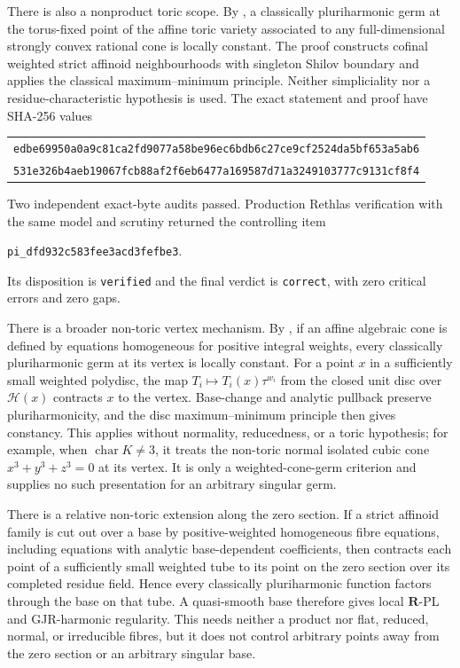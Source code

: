 There is also a nonproduct toric scope.  By
, a classically pluriharmonic germ
at the torus-fixed point of the affine toric variety associated to any
full-dimensional strongly convex rational cone is locally constant.  The
proof constructs cofinal weighted strict affinoid neighbourhoods with
singleton Shilov boundary and applies the classical maximum--minimum
principle.  Neither simpliciality nor a residue-characteristic hypothesis is
used.  The exact statement and proof have SHA-256 values
\begin{center}
\small
\begin{tabular}{@{}c@{}}
\nolinkurl{edbe69950a0a9c81ca2fd9077a58be96ec6bdb6c27ce9cf2524da5bf653a5ab6}\\
\nolinkurl{531e326b4aeb19067fcb88af2f6eb6477a169587d71a3249103777c9131cf8f4}
\end{tabular}
\end{center}
Two independent exact-byte audits passed.  Production Rethlas verification
with the same model and scrutiny returned the controlling item
\begin{center}
\small
\nolinkurl{pi_dfd932c583fee3acd3fefbe3}.
\end{center}
Its disposition is \texttt{verified} and the final verdict is
\texttt{correct}, with zero critical errors and zero gaps.

There is a broader non-toric vertex mechanism.  By
, if an affine
algebraic cone is defined by equations homogeneous for positive integral
weights, every classically pluriharmonic germ at its vertex is locally
constant.  For a point \(x\) in a sufficiently small weighted polydisc, the
map \(T_i\mapsto T_i(x)\tau^{w_i}\) from the closed unit disc over
\(\mathscr H(x)\) contracts \(x\) to the vertex.  Base-change and analytic
pullback preserve pluriharmonicity, and the disc maximum--minimum principle
then gives constancy.  This applies without normality, reducedness, or a
toric hypothesis; for example, when \(\operatorname{char}K\ne 3\), it treats
the non-toric normal isolated cubic cone \(x^3+y^3+z^3=0\) at its vertex.
It is only a weighted-cone-germ
criterion and supplies no such presentation for an arbitrary singular germ.

There is a relative non-toric extension along the zero section.  If a strict
affinoid family is cut out over a base by positive-weighted homogeneous fibre
equations, including equations with analytic base-dependent coefficients,
then  contracts each
point of a sufficiently small weighted tube to its point on the zero section
over its completed residue field.  Hence every classically pluriharmonic
function factors through the base on that tube.  A quasi-smooth base therefore
gives local \(\mathbf R\)-PL and GJR-harmonic regularity.  This needs neither
a product nor flat, reduced, normal, or irreducible fibres, but it does not
control arbitrary points away from the zero section or an arbitrary singular
base.

